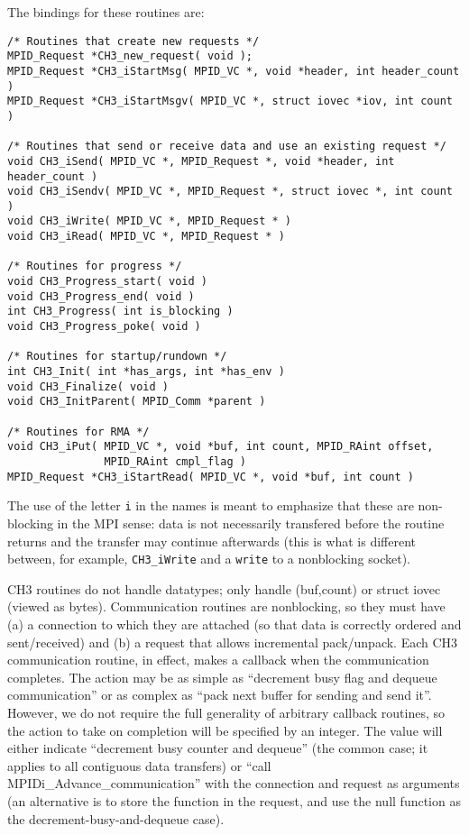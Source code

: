 \documentclass{article}
\def\code{\begingroup\makeustext\eatcode}
\def\eatcode#1{\texttt{#1}\endgroup}
\begin{document}
The bindings for these routines are:
\begin{verbatim}
/* Routines that create new requests */
MPID_Request *CH3_new_request( void );
MPID_Request *CH3_iStartMsg( MPID_VC *, void *header, int header_count )
MPID_Request *CH3_iStartMsgv( MPID_VC *, struct iovec *iov, int count )

/* Routines that send or receive data and use an existing request */
void CH3_iSend( MPID_VC *, MPID_Request *, void *header, int header_count )
void CH3_iSendv( MPID_VC *, MPID_Request *, struct iovec *, int count )
void CH3_iWrite( MPID_VC *, MPID_Request * )
void CH3_iRead( MPID_VC *, MPID_Request * )

/* Routines for progress */
void CH3_Progress_start( void )
void CH3_Progress_end( void )
int CH3_Progress( int is_blocking )
void CH3_Progress_poke( void )

/* Routines for startup/rundown */
int CH3_Init( int *has_args, int *has_env )
void CH3_Finalize( void )
void CH3_InitParent( MPID_Comm *parent )

/* Routines for RMA */
void CH3_iPut( MPID_VC *, void *buf, int count, MPID_RAint offset, 
               MPID_RAint cmpl_flag )
MPID_Request *CH3_iStartRead( MPID_VC *, void *buf, int count )
\end{verbatim}

The use of the letter \code{i} in the names is meant to emphasize that these
are non-blocking in the MPI sense: data is not necessarily transfered before
the routine returns and the transfer may continue afterwards (this is what is
different between, for example, \code{CH3_iWrite} and a \code{write} to a
nonblocking socket).

CH3 routines do not handle datatypes; only handle (buf,count) or struct iovec
(viewed 
as bytes).  Communication routines are nonblocking, so they must have (a) a
connection to which they are attached (so that data is correctly ordered and
sent/received) and (b) a request that allows incremental
pack/unpack.  Each CH3 communication routine, in effect, makes a callback when
the communication completes.  The action may be as simple as ``decrement busy
flag and dequeue communication'' or as complex as ``pack next buffer for
sending and send it''.  However, we do not require the full generality of
arbitrary callback routines, so the action to take on completion will be
specified by an integer.  The value will either indicate ``decrement busy
counter and dequeue'' (the common case; it applies to all contiguous data
transfers) or ``call MPIDi\_Advance\_communication'' with the connection and
request as arguments (an alternative is to store the function in the request,
and use the null function as the decrement-busy-and-dequeue case).
\end{document}
